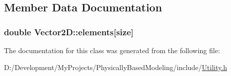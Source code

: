 \subsection{Member Data Documentation}
\hypertarget{class_vector2_d_a3bdf405eacce2d6efe0ea3d9b80bede5}{
\subsubsection[{elements}]{\setlength{\rightskip}{0pt plus 5cm}double Vector2\-D\-::elements\mbox{[}size\mbox{]}}}\label{class_vector2_d_a3bdf405eacce2d6efe0ea3d9b80bede5}


The documentation for this class was generated from the following file\-:\begin{DoxyCompactItemize}
\item 
D\-:/\-Development/\-My\-Projects/\-Physically\-Based\-Modeling/include/\hyperlink{_utility_8h}{Utility.\-h}\end{DoxyCompactItemize}
